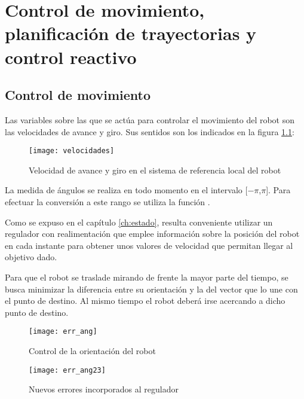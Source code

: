 
\chapter[Control de movimiento]
{Control de movimiento, planificación de trayectorias y control reactivo}%
\label{ch:movimiento}

\section{Control de movimiento}\label{control}

Las variables sobre las que se actúa para controlar el movimiento del robot son las velocidades de avance y giro. Sus sentidos son los indicados en la figura \ref{fg:velocidades}:

\begin{figure}[hbt]
  \centering\texttt{[image: velocidades]}\\
  \caption{Velocidad de avance y giro en el sistema de referencia local del robot}\label{fg:velocidades}
\end{figure}


La medida de ángulos se realiza en todo momento en el intervalo [$-\pi$,$\pi$]. Para efectuar la conversión a este rango se utiliza la función .

Como se expuso en el capítulo \ref{ch:estado}, resulta conveniente utilizar un regulador con realimentación que emplee información sobre la posición del robot en cada instante para obtener unos valores de velocidad que permitan llegar al objetivo dado.

Para que el robot se traslade mirando de frente la mayor parte del tiempo, se busca minimizar la diferencia entre su orientación y la del vector que lo une con el punto de destino. Al mismo tiempo el robot deberá irse acercando a dicho punto de destino.

\begin{figure}[bt]
  \centering\texttt{[image: err\_ang]}\\
  \caption{Control de la orientación del robot}\label{fg:err_ang}
\end{figure}

\begin{figure}[bt]
  \centering\texttt{[image: err\_ang23]}\\
  \caption{Nuevos errores incorporados al regulador}\label{fg:err_ang23}
\end{figure}

